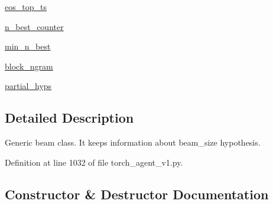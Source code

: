 \begin{DoxyCompactItemize}
\item 
\hyperlink{classparlai_1_1agents_1_1legacy__agents_1_1seq2seq_1_1torch__agent__v1_1_1Beam_ab1d9fb1a27a4a96ea9293720eb812487}{eos\+\_\+top\+\_\+ts}
\item 
\hyperlink{classparlai_1_1agents_1_1legacy__agents_1_1seq2seq_1_1torch__agent__v1_1_1Beam_a44a03facdc6259db57720fcae9f9a6ed}{n\+\_\+best\+\_\+counter}
\item 
\hyperlink{classparlai_1_1agents_1_1legacy__agents_1_1seq2seq_1_1torch__agent__v1_1_1Beam_a65b34839f24c68fa76df61cff22e177e}{min\+\_\+n\+\_\+best}
\item 
\hyperlink{classparlai_1_1agents_1_1legacy__agents_1_1seq2seq_1_1torch__agent__v1_1_1Beam_aa2ba93350ee7aa9ab2ae5ba01c1c0c1e}{block\+\_\+ngram}
\item 
\hyperlink{classparlai_1_1agents_1_1legacy__agents_1_1seq2seq_1_1torch__agent__v1_1_1Beam_a35c45bf55c21713f720fffdaafc68081}{partial\+\_\+hyps}
\end{DoxyCompactItemize}


\subsection{Detailed Description}
\begin{DoxyVerb}Generic beam class. It keeps information about beam_size hypothesis.\end{DoxyVerb}
 

Definition at line 1032 of file torch\+\_\+agent\+\_\+v1.\+py.



\subsection{Constructor \& Destructor Documentation}
\mbox{\label{classparlai_1_1agents_1_1legacy__agents_1_1seq2seq_1_1torch__agent__v1_1_1Beam_af0f9f1c8fc21c9a00932129c2239b6a9}} 
